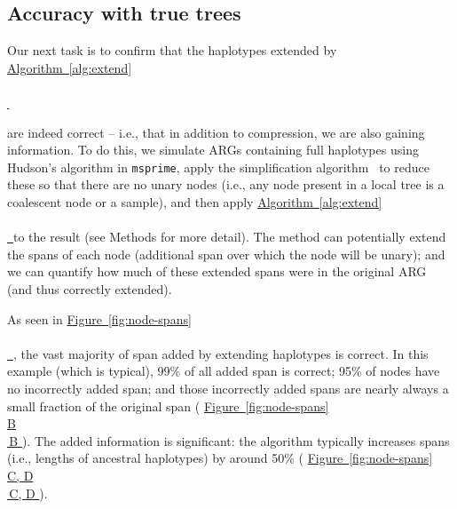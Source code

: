 \documentclass[10pt,twoside,lineno]{gsajnl}
\newcommand{\msprime}{\texttt{msprime}}
\newcommand{\algorithmref}[2][]{%
	\hyperref[{#2}]{%
		Algorithm~\ref*{#2}%
		\ifx\\#1\\%
		\else
		\,#1%
		\fi
	}%
}
\newcommand*{\figref}[2][]{%
	\hyperref[{#2}]{%
		Figure~\ref*{#2}%
		\ifx\\#1\\%
		\else
		\,#1%
		\fi
	}%
}
\begin{document}
\subsection{Accuracy with true trees}


Our next task is to confirm that the haplotypes extended by \algorithmref{alg:extend}
are indeed correct -- i.e., that in addition to compression, we are also gaining information.
To do this, 
we simulate ARGs containing full haplotypes using Hudson's algorithm in \msprime{},
apply the simplification algorithm~\citep{kelleher2018efficient,wong2024general}
to reduce these so that there are no unary nodes
(i.e., any node present in a local tree is a coalescent node or a sample),
and then apply \algorithmref{alg:extend} to the result
(see Methods for more detail).
The method can potentially extend the spans of each node
(additional span over which the node will be unary);
and we can quantify how much of these extended spans were in the original ARG
(and thus correctly extended).

%
%

As seen in \figref{fig:node-spans},
the vast majority of span added by extending haplotypes is correct.
In this example (which is typical),
99\% of all added span is correct;
95\% of nodes have no incorrectly added span; 
and those incorrectly added spans are nearly always a small fraction of the original span (\figref[B]{fig:node-spans}).
The added information is significant:
the algorithm typically increases spans (i.e., lengths of ancestral haplotypes)
by around 50\% (\figref[C, D]{fig:node-spans}).
\end{document}
